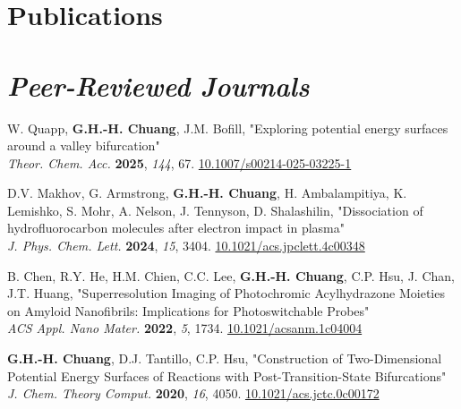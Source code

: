 
\section{\sc Publications}




\section{\sl Peer-Reviewed Journals}

W. Quapp, \textbf{G.H.-H. Chuang}, J.M. Bofill, "Exploring potential energy surfaces around a valley bifurcation"  \\
\textit{Theor. Chem. Acc.} \textbf{2025}, \textit{144}, 67.
\hfill
 \href{https://link.springer.com/article/10.1007/s00214-025-03225-1}{10.1007/s00214-025-03225-1} 


D.V. Makhov, G. Armstrong, \textbf{G.H.-H. Chuang}, H. Ambalampitiya, K. Lemishko, S. Mohr, A. Nelson, J. Tennyson, D. Shalashilin, "Dissociation of hydrofluorocarbon molecules after electron impact in plasma" \\
\textit{J. Phys. Chem. Lett.} \textbf{2024}, \textit{15}, 3404.
\hfill
\href{https://pubs.acs.org/doi/10.1021/acs.jpclett.4c00348}{10.1021/acs.jpclett.4c00348} 


B. Chen, R.Y. He, H.M. Chien, C.C. Lee, \textbf{G.H.-H. Chuang}, C.P. Hsu, J. Chan, J.T. Huang,
"Superresolution Imaging of Photochromic Acylhydrazone Moieties on Amyloid Nanofibrils: Implications for Photoswitchable Probes"\\
\textit{ACS Appl. Nano Mater. } \textbf{2022}, \textit{5}, 1734.
\hfill
\href{https://pubs.acs.org/doi/10.1021/acsanm.1c04004}{10.1021/acsanm.1c04004}

\textbf{G.H.-H. Chuang}, D.J. Tantillo, C.P. Hsu, "Construction of Two-Dimensional Potential Energy Surfaces of Reactions with Post-Transition-State Bifurcations"
\\
\textit{J. Chem. Theory Comput.} \textbf{2020}, \textit{16}, 4050.
\hfill
\href{https://pubs.acs.org/doi/10.1021/acs.jctc.0c00172}{10.1021/acs.jctc.0c00172}

